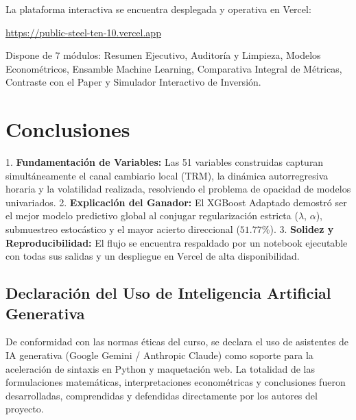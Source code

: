 \documentclass[12pt,letterpaper]{article}
\begin{document}
La plataforma interactiva se encuentra desplegada y operativa en Vercel:
\begin{center}
\url{https://public-steel-ten-10.vercel.app}
\end{center}
Dispone de 7 módulos: Resumen Ejecutivo, Auditoría y Limpieza, Modelos Econométricos, Ensamble Machine Learning, Comparativa Integral de Métricas, Contraste con el Paper y Simulador Interactivo de Inversión.

\section{Conclusiones}

1. \textbf{Fundamentación de Variables:} Las 51 variables construidas capturan simultáneamente el canal cambiario local (TRM), la dinámica autorregresiva horaria y la volatilidad realizada, resolviendo el problema de opacidad de modelos univariados.
2. \textbf{Explicación del Ganador:} El XGBoost Adaptado demostró ser el mejor modelo predictivo global al conjugar regularización estricta ($\lambda$, $\alpha$), submuestreo estocástico y el mayor acierto direccional ($51.77\%$).
3. \textbf{Solidez y Reproducibilidad:} El flujo se encuentra respaldado por un notebook ejecutable con todas sus salidas y un despliegue en Vercel de alta disponibilidad.

\subsection*{Declaración del Uso de Inteligencia Artificial Generativa}
De conformidad con las normas éticas del curso, se declara el uso de asistentes de IA generativa (Google Gemini / Anthropic Claude) como soporte para la aceleración de sintaxis en Python y maquetación web. La totalidad de las formulaciones matemáticas, interpretaciones econométricas y conclusiones fueron desarrolladas, comprendidas y defendidas directamente por los autores del proyecto.
\end{document}
